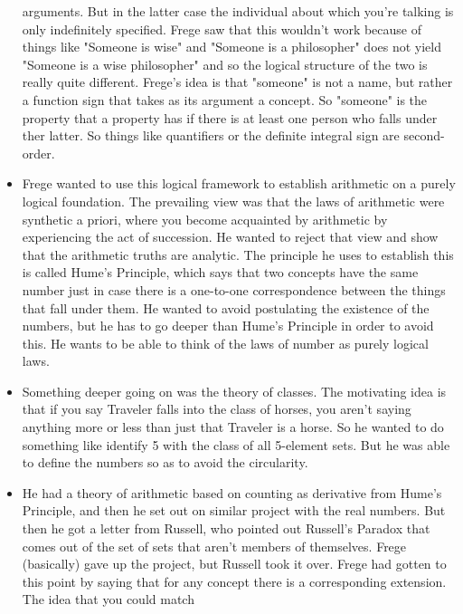 \documentclass[12pt]{article}
\theoremstyle{definition}
\begin{document}
\begin{itemize}
        arguments. But in the latter case the individual about which you're
        talking is only indefinitely specified. Frege saw that this wouldn't
        work because of things like "Someone is wise" and "Someone is a
        philosopher" does not yield "Someone is a wise philosopher" and so the
        logical structure of the two is really quite different. Frege's idea is
        that "someone" is not a name, but rather a function sign that takes as
        its argument a concept. So "someone" is the property that a property
        has if there is at least one person who falls under ther latter. So
        things like quantifiers or the definite integral sign are second-order.
    \item
        Frege wanted to use this logical framework to establish arithmetic on a
        purely logical foundation. The prevailing view was that the laws of
        arithmetic were synthetic a priori, where you become acquainted by
        arithmetic by experiencing the act of succession. He wanted to reject
        that view and show that the arithmetic truths are analytic. The
        principle he uses to establish this is called Hume's Principle, which
        says that two concepts have the same number just in case there is a
        one-to-one correspondence between the things that fall under them. He
        wanted to avoid postulating the existence of the numbers, but he has to
        go deeper than Hume's Principle in order to avoid this. He wants to be
        able to think of the laws of number as purely logical laws.
    \item
        Something deeper going on was the theory of classes. The motivating
        idea is that if you say Traveler falls into the class of horses, you
        aren't saying anything more or less than just that Traveler is a
        horse. So he wanted to do something like identify 5 with the class of
        all 5-element sets. But he was able to define the numbers so as to
        avoid the circularity.
    \item
        He had a theory of arithmetic based on counting as derivative from
        Hume's Principle, and then he set out on similar project with the real
        numbers. But then he got a letter from Russell, who pointed out
        Russell's Paradox that comes out of the set of sets that aren't members
        of themselves. Frege (basically) gave up the project, but Russell took
        it over. Frege had gotten to this point by saying that for any concept
        there is a corresponding extension. The idea that you could match

\end{itemize}
\end{document}
